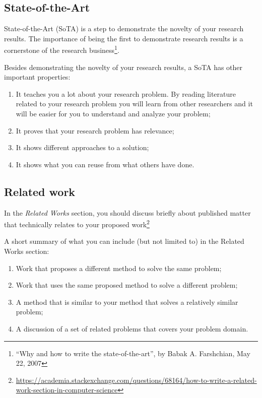 \subsection{State-of-the-Art}
\label{sec:state}

State-of-the-Art (SoTA) is a step to demonstrate the novelty of your research results. The importance of being the first to demonstrate research results is a cornerstone of the research business\footnote{``Why and how to write the state-of-the-art'', by Babak A. Farshchian, May 22, 2007}. 

Besides demonstrating the novelty of your research results, a SoTA has other important properties:
\begin{enumerate}
\item It teaches you a lot about your research problem. By reading literature related to your research problem you will learn from other researchers and it will be easier for you to understand and analyze your problem;
\item It proves that your research problem has relevance;
\item It shows different approaches to a solution;
\item It shows what you can reuse from what others have done. 
\end{enumerate}
 
 
\subsection{Related work}
\label{sec:relatedwork}

In the \textit{Related Works} section, you should discuss briefly about published matter that technically relates to your proposed work\footnote{\url{https://academia.stackexchange.com/questions/68164/how-to-write-a-related-work-section-in-computer-science}}

A short summary of what you can include (but not limited to) in the Related Works section:
\begin{enumerate}
\item Work that proposes a different method to solve the same problem;
\item Work that uses the same proposed method to solve a different problem;
\item A method that is similar to your method that solves a relatively similar problem;
\item A discussion of a set of related problems that covers your problem domain.
\end{enumerate}
    

